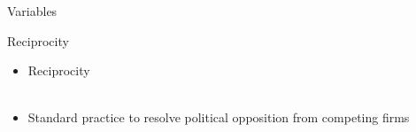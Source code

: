 \documentclass{beamer}
\begin{document}
\begin{frame}{Variables}
\end{frame}

\begin{frame}{Reciprocity}

\begin{itemize}
\item{Reciprocity}\\

\\

\justifying
\item{Standard practice to resolve political opposition from competing firms}\\
\end{itemize}



\end{frame}
\end{document}
